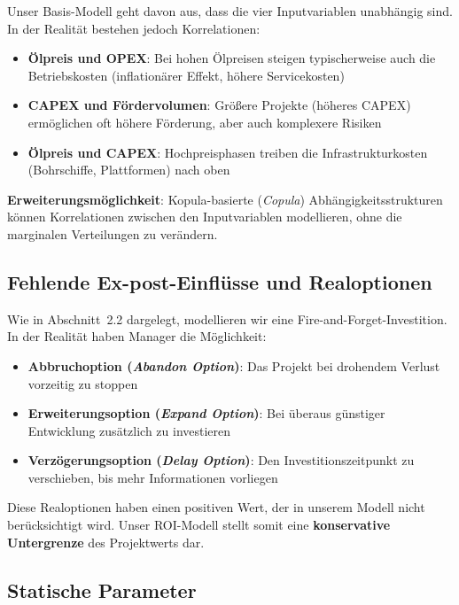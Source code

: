 \documentclass[11pt,a4paper]{article}
\begin{document}
Unser Basis-Modell geht davon aus, dass die vier Inputvariablen unabhängig sind. In der Realität bestehen jedoch Korrelationen:

\begin{itemize}[itemsep=2pt]
  \item \textbf{Ölpreis und OPEX}: Bei hohen Ölpreisen steigen typischerweise auch die Betriebskosten (inflationärer Effekt, höhere Servicekosten)
  \item \textbf{CAPEX und Fördervolumen}: Größere Projekte (höheres CAPEX) ermöglichen oft höhere Förderung, aber auch komplexere Risiken
  \item \textbf{Ölpreis und CAPEX}: Hochpreisphasen treiben die Infrastrukturkosten (Bohrschiffe, Plattformen) nach oben
\end{itemize}

\textbf{Erweiterungsmöglichkeit}: Kopula-basierte (\textit{Copula}) Abhängigkeitsstrukturen können Korrelationen zwischen den Inputvariablen modellieren, ohne die marginalen Verteilungen zu verändern.

\subsection{Fehlende Ex-post-Einflüsse und Realoptionen}

Wie in Abschnitt~2.2 dargelegt, modellieren wir eine \glqq Fire-and-Forget\grqq{}-Investition. In der Realität haben Manager die Möglichkeit:

\begin{itemize}[itemsep=2pt]
  \item \textbf{Abbruchoption (\textit{Abandon Option})}: Das Projekt bei drohendem Verlust vorzeitig zu stoppen
  \item \textbf{Erweiterungsoption (\textit{Expand Option})}: Bei überaus günstiger Entwicklung zusätzlich zu investieren
  \item \textbf{Verzögerungsoption (\textit{Delay Option})}: Den Investitionszeitpunkt zu verschieben, bis mehr Informationen vorliegen
\end{itemize}

Diese Realoptionen haben einen positiven Wert, der in unserem Modell nicht berücksichtigt wird. Unser ROI-Modell stellt somit eine \textbf{konservative Untergrenze} des Projektwerts dar.

\subsection{Statische Parameter}
\end{document}
